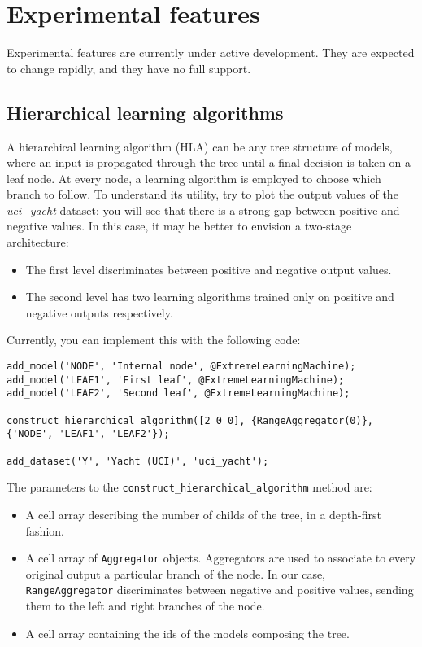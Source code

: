 \chapter{Experimental features}
\label{chap:expfeatures}

Experimental features are currently under active development. They are expected to change rapidly, and they have no full support.

\section{Hierarchical learning algorithms}

A hierarchical learning algorithm (HLA) can be any tree structure of models, where an input is propagated through the tree until a final decision is taken on a leaf node. At every node, a learning algorithm is employed to choose which branch to follow. To understand its utility, try to plot the output values of the \textit{uci\_yacht} dataset: you will see that there is a strong gap between positive and negative values. In this case, it may be better to envision a two-stage architecture:

\begin{itemize}
\item The first level discriminates between positive and negative output values.
\item The second level has two learning algorithms trained only on positive and negative outputs respectively.
\end{itemize}

\noindent Currently, you can implement this with the following code:

\begin{lstlisting}
add_model('NODE', 'Internal node', @ExtremeLearningMachine);
add_model('LEAF1', 'First leaf', @ExtremeLearningMachine);
add_model('LEAF2', 'Second leaf', @ExtremeLearningMachine);

construct_hierarchical_algorithm([2 0 0], {RangeAggregator(0)}, {'NODE', 'LEAF1', 'LEAF2'});

add_dataset('Y', 'Yacht (UCI)', 'uci_yacht');
\end{lstlisting}

\noindent The parameters to the \verb|construct_hierarchical_algorithm| method are:

\begin{itemize}
\item A cell array describing the number of childs of the tree, in a depth-first fashion.
\item A cell array of \verb|Aggregator| objects. Aggregators are used to associate to every original output a particular branch of the node. In our case, \verb|RangeAggregator| discriminates between negative and positive values, sending them to the left and right branches of the node.
\item A cell array containing the ids of the models composing the tree.
\end{itemize}

